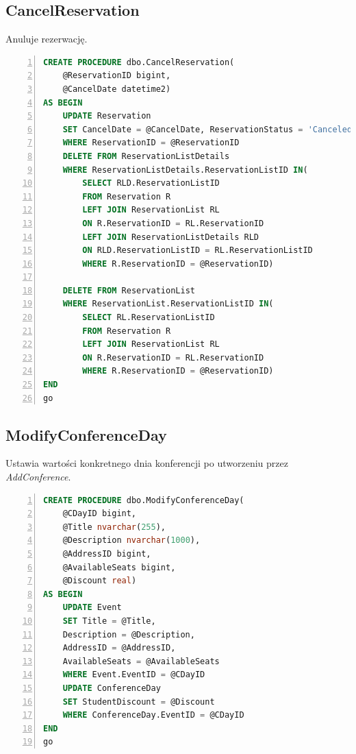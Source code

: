 \documentclass[]{article}
\begin{document}
	\subsection{CancelReservation}
	Anuluje rezerwację.
	\begin{lstlisting}[language=SQL,
						showspaces=false,
						basicstyle=\ttfamily,
						numbers=left,
						numberstyle=\tiny,
						backgroundcolor=\color{lightg},
						keywordstyle=\color{lightblue},
						commentstyle=\color{gray}]
CREATE PROCEDURE dbo.CancelReservation(
	@ReservationID bigint,
	@CancelDate datetime2)
AS BEGIN
	UPDATE Reservation
	SET CancelDate = @CancelDate, ReservationStatus = 'Canceled'
	WHERE ReservationID = @ReservationID
	DELETE FROM ReservationListDetails
	WHERE ReservationListDetails.ReservationListID IN(
		SELECT RLD.ReservationListID
		FROM Reservation R
		LEFT JOIN ReservationList RL
		ON R.ReservationID = RL.ReservationID
		LEFT JOIN ReservationListDetails RLD
		ON RLD.ReservationListID = RL.ReservationListID
		WHERE R.ReservationID = @ReservationID)
	
	DELETE FROM ReservationList
	WHERE ReservationList.ReservationListID IN(
		SELECT RL.ReservationListID
		FROM Reservation R
		LEFT JOIN ReservationList RL
		ON R.ReservationID = RL.ReservationID
		WHERE R.ReservationID = @ReservationID)
END
go
	\end{lstlisting}
	\subsection{ModifyConferenceDay}
	Ustawia wartości konkretnego dnia konferencji po utworzeniu przez \textit{AddConference}.
	\begin{lstlisting}[language=SQL,
						showspaces=false,
						basicstyle=\ttfamily,
						numbers=left,
						numberstyle=\tiny,
						backgroundcolor=\color{lightg},
						keywordstyle=\color{lightblue},
						commentstyle=\color{gray}]
CREATE PROCEDURE dbo.ModifyConferenceDay(
	@CDayID bigint,
	@Title nvarchar(255),
	@Description nvarchar(1000),
	@AddressID bigint,
	@AvailableSeats bigint,
	@Discount real)
AS BEGIN
	UPDATE Event
	SET Title = @Title,
	Description = @Description,
	AddressID = @AddressID,
	AvailableSeats = @AvailableSeats
	WHERE Event.EventID = @CDayID
	UPDATE ConferenceDay
	SET StudentDiscount = @Discount
	WHERE ConferenceDay.EventID = @CDayID
END
go
	\end{lstlisting}
\end{document}
